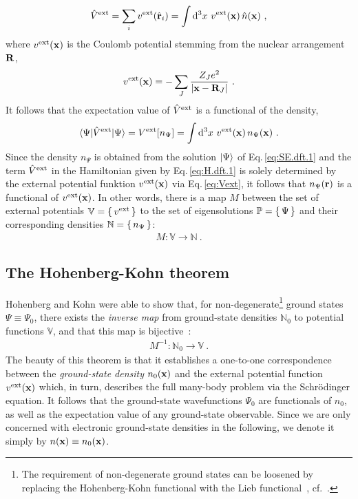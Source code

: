 \begin{align}
	\hat V^{\rm ext}
		= \sum_i v^{\rm ext} (\hat{\bf r}_i)
		= \int \d^3 x ~ v^{\rm ext} ({\bf x}) \, \hat n ({\bf x})~,
		\label{eq:Vext}
\end{align}
where $v^{\rm ext} ({\bf x})$ is the Coulomb potential stemming from the nuclear arrangement $\bf R$,
\begin{align}
	v^{\rm ext} ({\bf x})
		= -\sum_{J} \frac{Z_J e^{2}}{\left|\b x - {\bf R}_{J}\right|}~.
	\label{eq:dft.v^ext}
\end{align}
It follows that the expectation value of $\hat V^{\rm ext}$ is a functional of the density,
\begin{align}
	\braket{\Psi | \hat V^{\rm ext} | \Psi}
		= V^{\rm ext} [n_\Psi]
		= \int \d^3 x ~ v^{\rm ext} ({\bf x}) \, n_\Psi ({\bf x})~.
		\label{eq:dft.Vext.expectation}
\end{align}
Since the density $n_\Psi$ is obtained from the solution $\Ket{\Psi}$ of Eq.\,\eqref{eq:SE.dft.1} and the term $\hat V^{\rm ext}$ in the Hamiltonian given by Eq.\,\eqref{eq:H.dft.1} is solely determined by the external potential funktion $v^{\rm ext} ({\bf x})$ via Eq.\,\eqref{eq:Vext}, it follows that $n_\Psi ({\bf r})$ is a functional of $v^{\rm ext} ({\bf x})$. In other words, there is a map $M$ between the set of external potentials $\mathbb V = \set{v^{\rm ext}}$ to the set of eigensolutions $\mathbb P = \set{\Psi}$ and their corresponding densities $\mathbb N = \set{n_\Psi}$:
\begin{align}
	M: \mathbb V \rightarrow \mathbb N~.
	\label{eq:dft.map.1}
\end{align}

\subsection{The Hohenberg-Kohn theorem}
\label{sec:HK}
Hohenberg and Kohn were able to show that, for non-degenerate\footnote{The requirement of non-degenerate ground states can be loosened by replacing the Hohenberg-Kohn functional with the Lieb functional~\cite{Levy.1979,Lieb.1983,Englisch.1984a,Englisch.1984b}, cf.~\cite[Chp.\,4.2]{Dreizler2012}.
} ground states $\Psi \equiv \Psi_0$, there exists the \emph{inverse map} from ground-state densities $\mathbb N_0$ to potential functions $\mathbb V$, and that this map is bijective~\cite{Hohenberg.1964}:
\begin{align}
	M^{-1}: \mathbb N_0 \rightarrow \mathbb V~. 
\end{align}
The beauty of this theorem is that it establishes a one-to-one correspondence between the \emph{ground-state density} $n_0 ({\bf x})$ and the external potential function $v^{\rm ext} ({\bf x})$ which, in turn, describes the full many-body problem via the Schr\"odinger equation. It follows that the ground-state wavefunctions $\Psi_0$ are functionals of $n_0$, as well as the expectation value of any ground-state observable. Since we are only concerned with electronic ground-state densities in the following, we denote it simply by $n ({\bf x}) \equiv n_0 ({\bf x})$.

